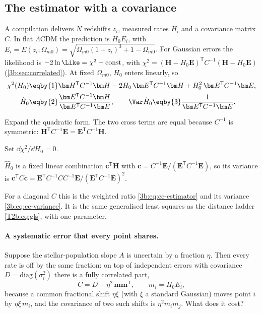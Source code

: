 \subsection{The estimator with a covariance}
\label{11c:sec:cc-gls}

A compilation delivers $N$ redshifts $z_i$, measured rates $H_i$ and a covariance matrix
$C$. In flat $\Lambda$CDM the prediction is $H_0E_i$, with
$E_i=E(z_i;\Omega_{m0})=\sqrt{\Omega_{m0}(1+z_i)^3+1-\Omega_{m0}}$. For Gaussian errors the
likelihood is $-2\ln\Like=\chi^2+\text{const}$, with
$\chi^2=(\bm H-H_0\bm E)^{\mathsf T}C^{-1}(\bm H-H_0\bm E)$ (\cref{3b:sec:correlated}). At fixed
$\Omega_{m0}$, $H_0$ enters linearly, so
\begin{align}
  \chi^2(H_0)
  &\eqby{1}\bm H^{\mathsf T}C^{-1}\bm H-2H_0\,\bm E^{\mathsf T}C^{-1}\bm H+H_0^2\,\bm E^{\mathsf T}C^{-1}\bm E,
  \nonumber\\
  \hat H_0
  &\eqby{2}\frac{\bm E^{\mathsf T}C^{-1}\bm H}{\bm E^{\mathsf T}C^{-1}\bm E},
  \qquad
  \Var\hat H_0\eqby{3}\frac{1}{\bm E^{\mathsf T}C^{-1}\bm E}.
  \label{11c:eq:cc-gls}
\end{align}
\begin{explain}
  \item Expand the quadratic form. The two cross terms are equal because $C^{-1}$ is
        symmetric: $\bm H^{\mathsf T}C^{-1}\bm E=\bm E^{\mathsf T}C^{-1}\bm H$.
  \item Set $\dd\chi^2/\dd H_0=0$.
  \item $\hat H_0$ is a fixed linear combination $\bm c^{\mathsf T}\bm H$ with
        $\bm c=C^{-1}\bm E/(\bm E^{\mathsf T}C^{-1}\bm E)$, so its variance is
        $\bm c^{\mathsf T}C\bm c=\bm E^{\mathsf T}C^{-1}CC^{-1}\bm E/(\bm E^{\mathsf T}C^{-1}\bm E)^2$.
\end{explain}
For a diagonal $C$ this is the weighted ratio \eqref{3b:eq:cc-estimator} and its
variance \eqref{3b:eq:cc-variance}. It is the same generalised least squares as the
distance ladder \eqref{T2b:eq:gls}, with one parameter.

\paragraph{A systematic error that every point shares.} Suppose the stellar-population
slope $A$ is uncertain by a fraction $\eta$. Then every rate is off by the same fraction:
on top of independent errors with covariance $D=\mathrm{diag}(\sigma_i^2)$ there is a
fully correlated part,
\[
  C=D+\eta^2\,\bm m\bm m^{\mathsf T},\qquad m_i=H_0E_i ,
\]
because a common fractional shift $\eta\xi$ (with $\xi$ a standard Gaussian) moves point $i$
by $\eta\xi\,m_i$, and the covariance of two such shifts is $\eta^2m_im_j$. What does it cost?

